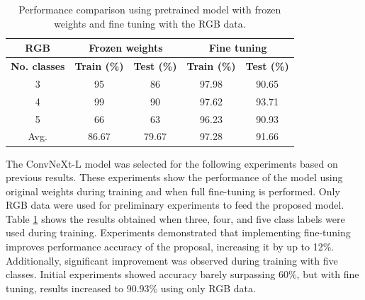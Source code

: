 \documentclass[mathematics,article,submit,pdftex,moreauthors]{Definitions/mdpi}
\begin{document}
\begin{table}[ht!]
\centering
\caption{Performance comparison using pretrained model with frozen weights and fine tuning with the RGB data. \label{tab:rgb_frozen_vs_fn}}
\begin{tabular}{c|cc|cc}
       \textbf{RGB}  & \multicolumn{2}{c|}{\textbf{Frozen weights}} & \multicolumn{2}{c}{\textbf{Fine tuning}} \\ \hline
\textbf{No. classes} & \textbf{Train (\%)}        & \textbf{Test (\%)}        & \textbf{Train (\%)}       & \textbf{Test (\%)}      \\ \hline
3                    & 95                    & 86                   & 97.98                & 90.65              \\
4                    & 99                    & 90                   & 97.62                & 93.71              \\
5                    & 66                    & 63                   & 96.23                & 90.93              \\ \hline
Avg.                 & 86.67                 & 79.67               &  97.28               &  91.66
\end{tabular}
\end{table}

The ConvNeXt-L model was selected for the following experiments based on previous results. These experiments show the performance of the model using original weights during training and when full fine-tuning is performed. Only RGB data were used for preliminary experiments to feed the proposed model. Table \ref{tab:rgb_frozen_vs_fn} shows the results obtained when three, four, and five class labels were used during training. Experiments demonstrated that implementing fine-tuning improves performance accuracy of the proposal, increasing it by up to 12\%. Additionally, significant improvement was observed during training with five classes. Initial experiments showed accuracy barely surpassing 60\%, but with fine tuning, results increased to 90.93\% using only RGB data.
\end{document}
